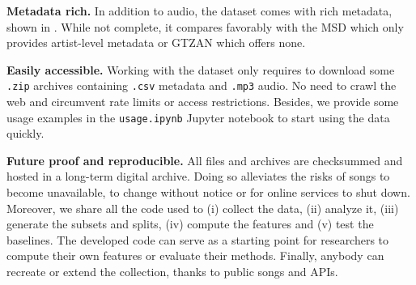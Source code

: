 \documentclass{article}
\newcommand{\todo}[1]{{\color{red} #1}}
\begin{document}
\textbf{Metadata rich.} In addition to audio, the dataset comes with rich metadata, shown in . While not complete, it compares favorably with the MSD which only provides artist-level metadata \cite{msd} or GTZAN which offers none.

\textbf{Easily accessible.} Working with the dataset only requires to download some \texttt{.zip} archives containing \texttt{.csv} metadata and \texttt{.mp3} audio. No need to crawl the web and circumvent rate limits or access restrictions. Besides, we provide
some usage examples in the \texttt{usage.ipynb} Jupyter notebook to start using the data quickly.

\textbf{Future proof and reproducible.} All files and archives are checksummed and hosted in a long-term digital archive.
Doing so alleviates the risks of songs to become unavailable, to change without notice or for online services to shut down.
Moreover, we share all the code used to (i) collect the data, (ii) analyze it, (iii) generate the subsets and splits, (iv) compute the features and (v) test the baselines. The developed code can serve as a starting point for researchers to compute their own features or evaluate their methods.
Finally, anybody can recreate or extend the collection, thanks to public songs and APIs.


\end{document}
